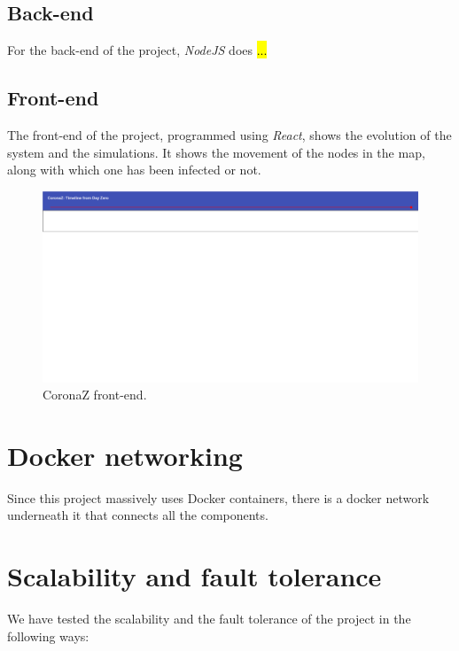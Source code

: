 \documentclass[conference]{IEEEtran}
\begin{document}
	\subsection{Back-end}
	
		For the back-end of the project, \textit{NodeJS} does \hl{...}
	
	\subsection{Front-end}

		The front-end of the project, programmed using \textit{React}, shows the evolution of the system and the simulations.
		It shows the movement of the nodes in the map, along with which one has been infected or not.
		
		\begin{figure}[htbp]
			\centerline{\includegraphics[width=\linewidth]{img/frontend.png}}
			\caption{CoronaZ front-end.}
			\label{fig:front-end}
		\end{figure}
	
\section{Docker networking}

	Since this project massively uses Docker containers, there is a docker network underneath it that connects all the components.
	
\section{Scalability and fault tolerance}

	We have tested the scalability and the fault tolerance of the project in the following ways:
	
\end{document}
